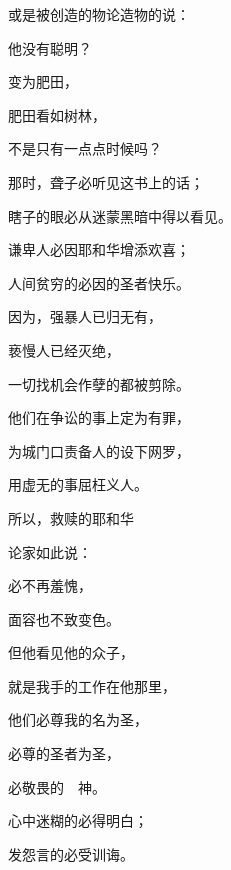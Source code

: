 {\par }{\Q 或是被创造的物论造物的说：
\par }{\Q 他没有聪明？
\par }{\BB \par }{\Q {}变为肥田，
\par }{\Q 肥田看如树林，
\par }{\Q 不是只有一点点时候吗？
\par }{\Q {}那时，聋子必听见这书上的话；
\par }{\Q 瞎子的眼必从迷蒙黑暗中得以看见。
\par }{\Q {}谦卑人必因耶和华增添欢喜；
\par }{\Q 人间贫穷的必因{}的圣者快乐。
\par }{\Q {}因为，强暴人已归无有，
\par }{\Q 亵慢人已经灭绝，
\par }{\Q 一切找机会作孽的都被剪除。
\par }{\Q {}他们在争讼的事上定{}为有罪，
\par }{\Q 为城门口责备人的设下网罗，
\par }{\Q 用虚无的事屈枉义人。
\par }{\BB \par }{\Q {}所以，救赎{}的耶和华
\par }{\Q 论{}家如此说：
\par }{必不再羞愧，
\par }{\Q 面容也不致变色。
\par }{\Q {}但他看见他的众子，
\par }{\Q 就是我手的工作在他那里，
\par }{\Q 他们必尊我的名为圣，
\par }{\Q 必尊{}的圣者为圣，
\par }{\Q 必敬畏{}的　神。
\par }{\Q {}心中迷糊的必得明白；
\par }{\Q 发怨言的必受训诲。

}
